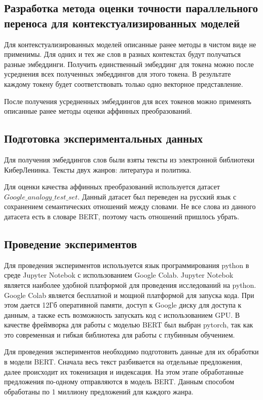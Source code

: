 \documentclass[a4paper,14pt]{article}
\begin{document}
	\subsection{Разработка метода оценки точности параллельного переноса для контекстуализированных моделей}
	
	Для контекстуализированных моделей описанные ранее методы в чистом виде не применимы.
	Для одних и тех же слов в разных контекстах будут получаться разные эмбеддинги.
	Получить единственный эмбеддинг для токена можно после усреднения всех полученных эмбеддингов для этого токена.
	В результате каждому токену будет соответствовать только одно векторное представление.
	
	После получения усредненных эмбеддингов для всех токенов можно применять описанные ранее методы оценки аффинных преобразований.
	
	\subsection{Подготовка экспериментальных данных}
	
	Для получения эмбеддингов слов были взяты тексты из электронной библиотеки КиберЛенинка.
	Тексты двух жанров: литература и политика.
	
	Для оценки качества аффинных преобразований используется датасет $Google\_analogy\_test\_set$.
	Данный датасет был переведен на русский язык с сохранением семантических отношений между словами.
	Не все слова из данного датасета есть в словаре BERT, поэтому часть отношений пришлось убрать.
	
	\subsection{Проведение экспериментов}
	
	Для проведения экспериментов используется язык программирования python в среде Jupyter Notebok с использованием Google Colab.
	Jupyter Notebok является наиболее удобной платформой для проведения исследований на python.
	Google Colab является бесплатной и мощной платформой для запуска кода.
	При этом дается 12Гб оперативной памяти, доступ к Google диску для доступа к данным, а также есть возможность запускать код с использованием GPU.
	В качестве фреймворка для работы с моделью BERT был выбран pytorch, так как это современная и гибкая библиотека для работы с глубинным обучением.
	
	Для проведения экспериментов необходимо подготовить данные для их обработки в модели BERT.
	Сначала весь текст разбивается на отдельные предложения, далее происходит их токенизация и индексация.
	На этом этапе обработанные предложения по-одному отправляются в модель BERT.
	Данным способом обработаны по 1 миллиону предложений для каждого жанра.
	
\end{document}
